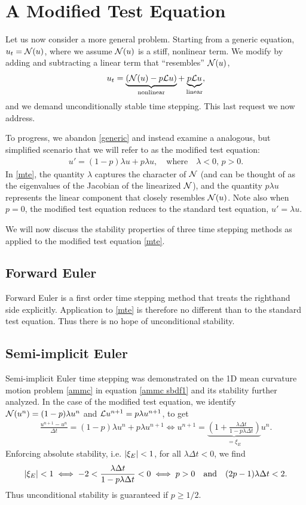 \section{A Modified Test Equation}
Let us now consider a more general problem. Starting from a generic equation, $u_t = \mathcal{N}(u)$, where we assume $\mathcal{N}(u)$ is a stiff, nonlinear term. We modify by adding and subtracting a linear term that ``resembles'' $\mathcal{N}(u)$,
\begin{align}
u_t = \underbrace{ (\mathcal{N}(u) - p\mathcal{L} u)}_\text{nonlinear} + \underbrace{p\mathcal{L} u}_\text{linear},
\label{generic} 
\end{align}
and we demand unconditionally stable time stepping. This last request we now address.

To progress, we abandon \eqref{generic} and instead examine a analogous, but simplified scenario that we will refer to as the modified test equation: 
\begin{align}
u' = (1-p)\lambda u + p\lambda u,
\quad\text{where}\quad \lambda < 0\text{, } p>0.
\label{mte}
\end{align}
In \eqref{mte}, the quantity $\lambda$ captures the character of $\mathcal{N}$ (and can be thought of as the eigenvalues of the Jacobian of the linearized $\mathcal{N}$), and the quantity $p\lambda u$ represents the linear component that closely resembles $\mathcal{N}(u)$. Note also when $p=0$, the modified test equation reduces to the standard test equation, $u'=\lambda u$.

We will now discuss the stability properties of three time stepping methods as applied to the modified test equation \eqref{mte}.

\subsection{Forward Euler}
Forward Euler is a first order time stepping method that treats the righthand side explicitly. Application to \eqref{mte} is therefore no different than to the standard test equation. Thus there is no hope of unconditional stability.

\subsection{Semi-implicit Euler}
Semi-implicit Euler time stepping was demonstrated on the 1D mean curvature motion problem \eqref{ammc} in equation \eqref{ammc sbdf1} and its stability further analyzed. In the case of the modified test equation, we identify $\mathcal{N}(u^n) = (1-p)\lambda u^n$ and $\mathcal{L} u^{n+1} = p\lambda u^{n+1}$, to get 
\begin{align}
\frac{u^{n+1} - u^n}{\Delta t} 
= (1-p)\lambda u^n + p\lambda u^{n+1} 
\iff 
u^{n+1} 
= \underbrace{\left(1 + \frac{\lambda \Delta t}{1 - p\lambda\Delta t} \right)}_{=\xi_E} u^n.
\end{align}
Enforcing absolute stability, i.e. $\left|\xi_E\right| < 1$, for all $\lambda\Delta t < 0$, we find 
\begin{align}
\left|\xi_E\right| < 1 \iff 
-2 < \frac{\lambda\Delta t}{1 - p\lambda\Delta t} < 0
\iff p > 0 \quad\text{and}\quad (2p-1)\lambda\Delta t < 2.
\end{align}
Thus unconditional stability is guaranteed if $p \geq 1/2$.

